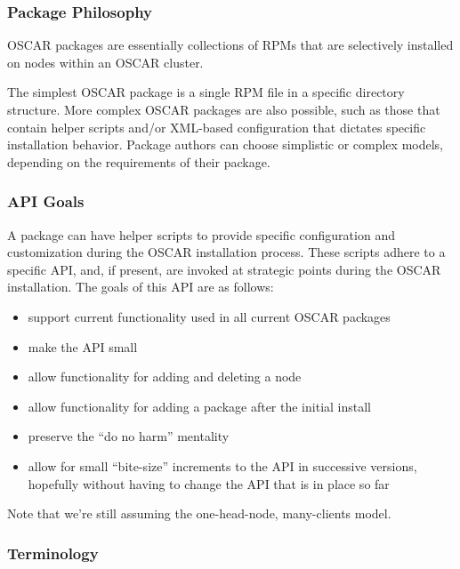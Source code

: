 \subsubsection{Package Philosophy}

OSCAR packages are essentially collections of RPMs that are
selectively installed on nodes within an OSCAR cluster.

The simplest OSCAR package is a single RPM file in a specific
directory structure.  More complex OSCAR packages are also possible,
such as those that contain helper scripts and/or XML-based
configuration that dictates specific installation behavior.  Package
authors can choose simplistic or complex models, depending on the
requirements of their package.


\subsubsection{API Goals}

A package can have helper scripts to provide specific configuration
and customization during the OSCAR installation process.  These
scripts adhere to a specific API, and, if present, are invoked at
strategic points during the OSCAR installation.  The goals of this API
are as follows:

\begin{itemize}
\item support current functionality used in all current OSCAR packages
\item make the API small
\item allow functionality for adding and deleting a node
\item allow functionality for adding a package after the initial
  install
\item preserve the ``do no harm'' mentality
\item allow for small ``bite-size'' increments to the API in
  successive versions, hopefully without having to change the API that
  is in place so far
\end{itemize}

Note that we're still assuming the one-head-node, many-clients model.


\subsubsection{Terminology}

